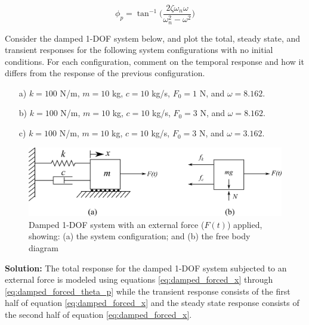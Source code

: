 \documentclass[12pt,letter]{article}
\begin{document}
	\begin{equation}
		\phi_p = \tan^{-1} \bigg(\frac{2\zeta \omega_n \omega}{\omega_n^2 - \omega^2}\bigg)
		\label{eq:damped_forced_theta_p}
	\end{equation}		
	\begin{example}
	\label{ex:homogeneous_and_particular_solutions_in_resonance}		
		Consider the damped 1-DOF system below, and plot the total, steady state, and transient responses for the following system configurations with no initial conditions. For each configuration, comment on the temporal response and how it differs from the response of the previous configuration.    
		
		\begin{itemize}
		\item[a)] $k=100$ N/m, $m=10$ kg,  $c=10$ kg/s, $F_0=1$ N, and $\omega = 8.162$.
		\item[b)] $k=100$ N/m, $m=10$ kg,  $c=10$ kg/s, $F_0=3$ N, and $\omega = 8.162$.
		\item[c)] $k=100$ N/m, $m=10$ kg,  $c=10$ kg/s, $F_0=3$ N, and $\omega = 3.162$.
		\end{itemize}
		
		\begin{figure}[H]
			\centering
			\includegraphics[]{../figures/1-DOF-spring_dashpot_mass_horizontal_forced_FBD.png}
			\caption{Damped 1-DOF system with an external force ($F(t)$) applied, showing: (a) the system configuration; and (b) the free body diagram}
		\end{figure}
		
		\noindent\textbf{Solution:} The total response for the damped 1-DOF system subjected to an external force is modeled using equations \ref{eq:damped_forced_x} through \ref{eq:damped_forced_theta_p} while the transient response consists of the first half of equation \ref{eq:damped_forced_x} and the steady state response consists of the second half of equation \ref{eq:damped_forced_x}.  
		

\end{example}
\end{document}
